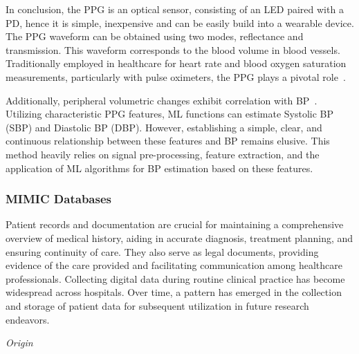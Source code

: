 \vspace{0.2cm}

In conclusion, the PPG is an optical sensor, consisting of an LED paired with a PD, hence it is simple, inexpensive and can be easily build into a wearable device.
The PPG waveform can be obtained using two modes, reflectance and transmission.
This waveform corresponds to the blood volume in blood vessels.
Traditionally employed in healthcare for heart rate and blood oxygen saturation measurements, particularly with pulse oximeters, the PPG plays a pivotal role~\cite{allenPhotoplethysmographyItsApplication2007a}.

Additionally, peripheral volumetric changes exhibit correlation with BP~\cite{langewoutersPressurediameterRelationshipsSegments1986}.
Utilizing characteristic PPG features, ML functions can estimate Systolic BP (SBP) and Diastolic BP (DBP).
However, establishing a simple, clear, and continuous relationship between these features and BP remains elusive.
This method heavily relies on signal pre-processing, feature extraction, and the application of ML algorithms for BP estimation based on these features.

\subsubsection{MIMIC Databases}
\label{subsubsec:mimic}

Patient records and documentation are crucial for maintaining a comprehensive overview of medical history, aiding in accurate diagnosis, treatment planning, and ensuring continuity of care.
They also serve as legal documents, providing evidence of the care provided and facilitating communication among healthcare professionals.
Collecting digital data during routine clinical practice has become widespread across hospitals.
Over time, a pattern has emerged in the collection and storage of patient data for subsequent utilization in future research endeavors.

\vspace{0.2cm}
\textit{Origin}
\vspace{0.2cm}

